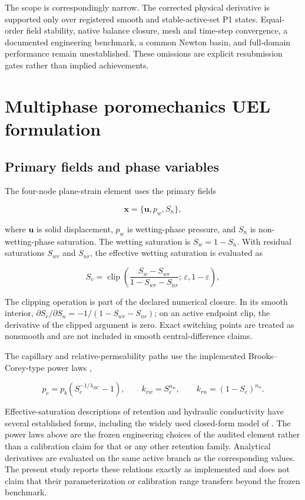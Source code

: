 \documentclass[preprint,12pt,authoryear]{elsarticle}
\begin{document}
The scope is correspondingly narrow. The corrected physical derivative is supported only over registered smooth and stable-active-set P1 states. Equal-order field stability, native balance closure, mesh and time-step convergence, a documented engineering benchmark, a common Newton basin, and full-domain performance remain unestablished. These omissions are explicit resubmission gates rather than implied achievements.

\section{Multiphase poromechanics UEL formulation}

\subsection{Primary fields and phase variables}

The four-node plane-strain element uses the primary fields

\begin{equation}
\mathbf{x}=\{\mathbf{u},p_w,S_n\},
\end{equation}

where $\mathbf{u}$ is solid displacement, $p_w$ is wetting-phase pressure, and $S_n$ is non-wetting-phase saturation. The wetting saturation is $S_w=1-S_n$. With residual saturations $S_{wr}$ and $S_{nr}$, the effective wetting saturation is evaluated as

\begin{equation}
S_e=\operatorname{clip}\left(
\frac{S_w-S_{wr}}{1-S_{wr}-S_{nr}};\,
\varepsilon,1-\varepsilon
\right),
\end{equation}

The clipping operation is part of the declared numerical closure. In its smooth interior, $\partial S_e/\partial S_n=-1/(1-S_{wr}-S_{nr})$; on an active endpoint clip, the derivative of the clipped argument is zero. Exact switching points are treated as nonsmooth and are not included in smooth central-difference claims.

The capillary and relative-permeability paths use the implemented Brooks--Corey-type power laws \citep{brookscorey1964},

\begin{equation}
p_c=p_b\left(S_e^{-1/\lambda_{BC}}-1\right),
\qquad
k_{rw}=S_e^{n_w},
\qquad
k_{rn}=(1-S_e)^{n_n}.
\end{equation}

Effective-saturation descriptions of retention and hydraulic conductivity have several established forms, including the widely used closed-form model of \citet{vangenuchten1980}. The power laws above are the frozen engineering choices of the audited element rather than a calibration claim for that or any other retention family. Analytical derivatives are evaluated on the same active branch as the corresponding values. The present study reports these relations exactly as implemented and does not claim that their parameterization or calibration range transfers beyond the frozen benchmark.
\end{document}
